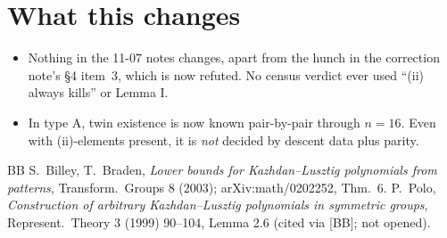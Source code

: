 \documentclass[11pt]{amsart}
\theoremstyle{definition}
\begin{document}
\section{What this changes}
\begin{itemize}[leftmargin=*]
\item Nothing in the 11-07 notes changes, apart from the hunch in the correction note's \S4 item~3, which is now refuted. No census verdict ever used ``(ii) always kills'' or Lemma I.
\item In type A, twin existence is now known pair-by-pair through $n=16$. Even with (ii)-elements present, it is \emph{not} decided by descent data plus parity.
\end{itemize}

\begin{thebibliography}{BB}\small
{} S.~Billey, T.~Braden, \emph{Lower bounds for Kazhdan--Lusztig polynomials from patterns}, Transform.\ Groups 8 (2003); arXiv:math/0202252, Thm.~6.
 P.~Polo, \emph{Construction of arbitrary Kazhdan--Lusztig polynomials in symmetric groups}, Represent.\ Theory 3 (1999) 90--104, Lemma 2.6 (cited via [BB]; not opened).
\end{thebibliography}
\end{document}

